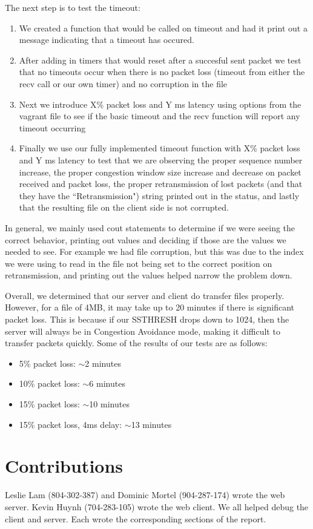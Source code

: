 \documentclass{article}
\begin{document}
    The next step is to test the timeout:
    \begin{enumerate}
        \item We created a function that would be called on timeout and
            had it print out a message indicating that a timeout has occured.
        \item After adding in timers that would reset after a succesful sent
            packet we test that no timeouts occur when there is no packet loss
            (timeout from either the recv call or our own timer) and no
            corruption in the file
        \item Next we introduce X\% packet loss and Y ms latency using
            options from the vagrant file to see if the basic timeout and 
            the recv function will report any timeout occurring 
        \item Finally we use our fully implemented timeout function with X\% 
            packet loss and Y ms latency to test that we are observing the
            proper sequence number increase, the proper congestion window size
            increase and decrease on packet received and packet loss, the
            proper retransmission of lost packets (and that they have the
            ``Retransmission") string printed out in the status, and lastly
            that the resulting file on the client side is not corrupted.
    \end{enumerate}

    In general, we mainly used cout statements to determine if we were seeing
    the correct behavior, printing out values and deciding if those are the
    values we needed to see.  For example we had file corruption, but this was
    due to the index we were using to read in the file not being set to the
    correct position on retransmission, and printing out the values helped
    narrow the problem down.

    Overall, we determined that our server and client do transfer files
    properly. However, for a file of 4MB, it may take up to 20 minutes if there
    is significant packet loss. This is because if our SSTHRESH drops down to
    1024, then the server will always be in Congestion Avoidance mode, making
    it difficult to transfer packets quickly. Some of the results of our tests
    are as follows:
    \begin{itemize}
        \item 5\% packet loss: $\sim$2 minutes
        \item 10\% packet loss: $\sim$6 minutes
        \item 15\% packet loss: $\sim$10 minutes
        \item 15\% packet loss, 4ms delay: $\sim$13 minutes
    \end{itemize}

\section{Contributions}
    Leslie Lam (804-302-387) and Dominic Mortel (904-287-174) wrote the web
    server. Kevin Huynh (704-283-105) wrote the web client. We all helped debug
    the client and server. Each wrote the corresponding sections of the report.
\end{document}
